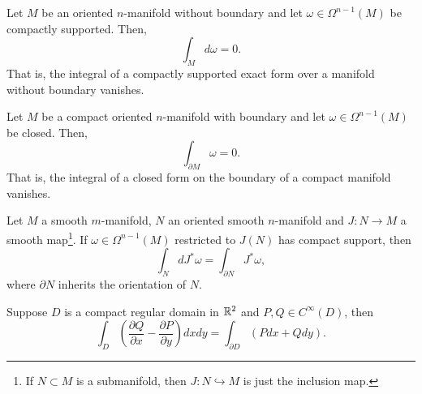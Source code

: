 \begin{corollary}
  Let $M$ be an oriented $n$-manifold without boundary and let $\omega\in\Omega^{n-1}(M)$ be compactly supported.
  Then,
  \begin{equation}
    \int_M d\omega = 0.
  \end{equation}
  That is, the integral of a compactly supported exact form over a manifold without boundary vanishes.
\end{corollary}

\begin{corollary}
  Let $M$ be a compact oriented $n$-manifold with boundary and let $\omega\in\Omega^{n-1}(M)$ be closed.
  Then,
  \begin{equation}
    \int_{\partial M} \omega = 0.
  \end{equation}
  That is, the integral of a closed form on the boundary of a compact manifold vanishes.
\end{corollary}

\begin{corollary}
  Let $M$ a smooth $m$-manifold, $N$ an oriented smooth $n$-manifold and $J:N\to M$ a smooth map\footnote{If $N\subset M$ is a submanifold, then $J:N\hookrightarrow M$ is just the inclusion map.}.
  If $\omega\in\Omega^{n-1}(M)$ restricted to $J(N)$ has compact support, then
  \begin{equation}
    \int_{N} d J^*\omega = \int_{\partial N} J^*\omega,
  \end{equation}
  where $\partial N$ inherits the orientation of $N$.
\end{corollary}

\begin{corollary}
  Suppose $D$ is a compact regular domain in $\mathbb{R}^2$ and $P,Q\in C^\infty(D)$, then
  \begin{equation}
    \int_D \left(\frac{\partial Q}{\partial x} - \frac{\partial P}{\partial y}\right)dxdy = \int_{\partial D}(Pdx + Qdy).
  \end{equation}
\end{corollary}

